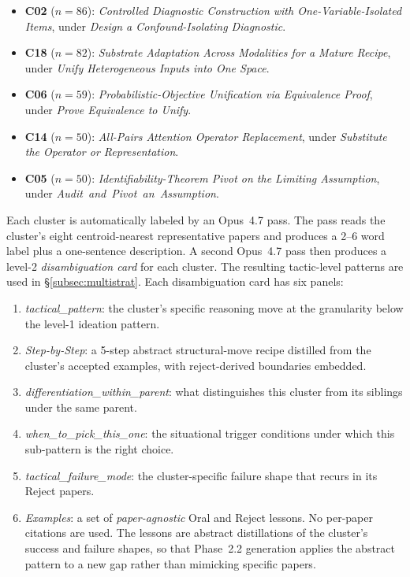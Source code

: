\documentclass[10pt,a4paper]{article}
\begin{document}
\begin{itemize}[nosep, leftmargin=1.5em]
\item \textbf{C02} (\(n{=}86\)): \emph{Controlled Diagnostic Construction with One-Variable-Isolated Items}, under \emph{Design a Confound-Isolating Diagnostic}.
\item \textbf{C18} (\(n{=}82\)): \emph{Substrate Adaptation Across Modalities for a Mature Recipe}, under \emph{Unify Heterogeneous Inputs into One Space}.
\item \textbf{C06} (\(n{=}59\)): \emph{Probabilistic-Objective Unification via Equivalence Proof}, under \emph{Prove Equivalence to Unify}.
\item \textbf{C14} (\(n{=}50\)): \emph{All-Pairs Attention Operator Replacement}, under \emph{Substitute the Operator or Representation}.
\item \textbf{C05} (\(n{=}50\)): \emph{Identifiability-Theorem Pivot on the Limiting Assumption}, under \mbox{\emph{Audit and Pivot an Assumption}}.
\end{itemize}

Each cluster is automatically labeled by an Opus~4.7 pass. The pass reads the cluster's eight centroid-nearest representative papers and produces a 2--6 word label plus a one-sentence description. A second Opus~4.7 pass then produces a level-2 \emph{disambiguation card} for each cluster. The resulting tactic-level patterns are used in \S\ref{subsec:multistrat}. Each disambiguation card has six panels:

\begin{enumerate}[nosep, leftmargin=1.5em]
\item \emph{tactical\_pattern}: the cluster's specific reasoning move at the granularity below the level-1 ideation pattern.
\item \emph{Step-by-Step}: a 5-step abstract structural-move recipe distilled from the cluster's accepted examples, with reject-derived boundaries embedded.
\item \emph{differentiation\_within\_parent}: what distinguishes this cluster from its siblings under the same parent.
\item \emph{when\_to\_pick\_this\_one}: the situational trigger conditions under which this sub-pattern is the right choice.
\item \emph{tactical\_failure\_mode}: the cluster-specific failure shape that recurs in its Reject papers.
\item \emph{Examples}: a set of \emph{paper-agnostic} Oral and Reject lessons. No per-paper citations are used. The lessons are abstract distillations of the cluster's success and failure shapes, so that Phase~2.2 generation applies the abstract pattern to a new gap rather than mimicking specific papers.
\end{enumerate}
\end{document}
